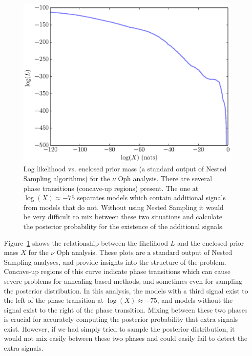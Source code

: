 \documentclass[useAMS,usenatbib]{mn2e}
\begin{document}
\begin{figure}
\includegraphics[scale=0.45]{Figures/logl0.eps}
\caption{Log likelihood vs. enclosed prior mass (a standard output of Nested
Sampling algorithms) for the $\nu$ Oph analysis.
There are several phase transitions (concave-up regions) present. The one at
$\log(X) \approx -75$ separates models which contain additional signals from
models that do not. Without using Nested Sampling it would be very difficult
to mix between these two situations and calculate the posterior probability
for the existence of the additional signals.
\label{fig:logl0}}
\end{figure}

Figure~\ref{fig:logl0} shows the relationship between the likelihood $L$
and the enclosed prior mass $X$ for the $\nu$ Oph analysis. These plots are
a standard output of Nested Sampling analyses, and provide
insights into the structure of the problem. Concave-up regions of this curve
indicate phase transitions which can cause severe problems for annealing-based
methods, and sometimes even for sampling the posterior distribution. In this
analysis, the models with a third signal exist to the left of the phase
transition at $\log(X) \approx -75$, and models without the signal exist to the
right of the phase transition. Mixing between these two phases is crucial for
accurately computing the posterior probability that extra signals exist.
However, if we had simply tried to sample the posterior distribution, it would
not mix easily between these two phases and could easily fail to detect the
extra signals.
\end{document}
